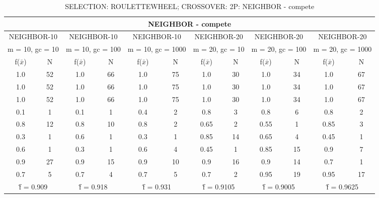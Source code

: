 \begin{table}[H]
	\centering
	\caption{SELECTION: ROULETTEWHEEL; CROSSOVER: 2P: NEIGHBOR - compete}
	\begin{adjustbox}{width=1\textwidth}
		\begin{tabular}{ |c|c||c|c||c|c||c|c||c|c||c|c| }
			\hline
			\multicolumn{12}{|c|}{NEIGHBOR - compete} \\
			\hline
			\multicolumn{2}{|c||}{NEIGHBOR-10} & \multicolumn{2}{c||}{NEIGHBOR-10} & \multicolumn{2}{c||}{NEIGHBOR-10} & \multicolumn{2}{c||}{NEIGHBOR-20} & \multicolumn{2}{c||}{NEIGHBOR-20} & \multicolumn{2}{c|}{NEIGHBOR-20}\\
			\hline
			\multicolumn{2}{|c||}{m = 10, gc = 10} & \multicolumn{2}{c||}{m = 10, gc = 100} & \multicolumn{2}{c||}{m = 10, gc = 1000} & \multicolumn{2}{c||}{m = 20, gc = 10} & \multicolumn{2}{c||}{m = 20, gc = 100} & \multicolumn{2}{c|}{m = 20, gc = 1000}\\
			\hline
			f($\bar{x}$) & N & f($\bar{x}$) & N & f($\bar{x}$) & N & f($\bar{x}$) & N & f($\bar{x}$) & N & f($\bar{x}$) & N\\
			\hline
			\hline
			1.0 & 52 & 1.0 & 66 & 1.0 & 75 & 1.0 & 30 & 1.0 & 34 & 1.0 & 67\\
			\hline
			1.0 & 52 & 1.0 & 66 & 1.0 & 75 & 1.0 & 30 & 1.0 & 34 & 1.0 & 67\\
			1.0 & 52 & 1.0 & 66 & 1.0 & 75 & 1.0 & 30 & 1.0 & 34 & 1.0 & 67\\
			0.1 & 1 & 0.1 & 1 & 0.4 & 2 & 0.8 & 3 & 0.8 & 6 & 0.8 & 2\\
			0.8 & 12 & 0.8 & 10 & 0.8 & 2 & 0.65 & 2 & 0.55 & 1 & 0.85 & 3\\
			0.3 & 1 & 0.6 & 1 & 0.3 & 1 & 0.85 & 14 & 0.65 & 4 & 0.45 & 1\\
			0.6 & 1 & 0.3 & 1 & 0.6 & 4 & 0.45 & 1 & 0.85 & 15 & 0.9 & 7\\
			0.9 & 27 & 0.9 & 15 & 0.9 & 10 & 0.9 & 16 & 0.9 & 14 & 0.7 & 1\\
			0.7 & 5 & 0.7 & 4 & 0.7 & 5 & 0.7 & 2 & 0.95 & 19 & 0.95 & 17\\
			\hline
			\multicolumn{2}{|c||}{\^{f} = 0.909} & \multicolumn{2}{c||}{\^{f} = 0.918} & \multicolumn{2}{c||}{\^{f} = 0.931} & \multicolumn{2}{c||}{\^{f} = 0.9105} & \multicolumn{2}{c||}{\^{f} = 0.9005} & \multicolumn{2}{c|}{\^{f} = 0.9625}\\
			\hline
		\end{tabular}
	\end{adjustbox}
\end{table}
